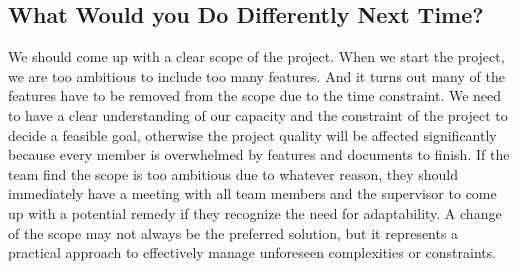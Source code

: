 \documentclass{article}
\begin{document}
\subsection{What Would you Do Differently Next Time?}
We should come up with a clear scope of the project. When we start the project, we are too ambitious to include too many features. And it turns out many of the features have to be removed from the scope due to the time constraint. We need to have a clear understanding of our capacity and the constraint of the project to decide a feasible goal, otherwise the project quality will be affected significantly because every member is overwhelmed by features and documents to finish.
If the team find the scope is too ambitious due to whatever reason, they should immediately have a meeting with all team members and the supervisor to come up with a potential remedy if they recognize the need for adaptability. A change of the scope may not always be the preferred solution, but it represents a practical approach to effectively manage unforeseen complexities or constraints.
\end{document}

